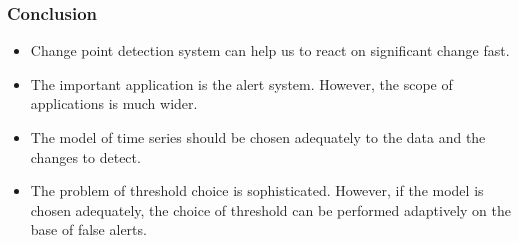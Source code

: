 \documentclass[intlimits, 9pt, unicode]{beamer}
\begin{document}
\begin{frame}
    \frametitle{Conclusion}

	    \begin{itemize}
	    \item Change point detection system can help us to react on significant change fast.

\bigskip
		\item The important application is the alert system. However,  the scope of applications
is much wider.

\bigskip
		\item The model of time series should be chosen adequately to the data and the changes to detect.

\bigskip
        \item The problem of threshold choice is sophisticated. However, if the model is chosen adequately,
        the choice of threshold can be performed adaptively on the base of false alerts. 	    \end{itemize}

 \end{frame}




\end{document}
